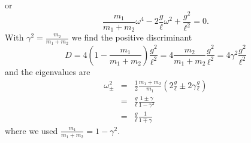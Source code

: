 \documentclass[letterpaper,11pt]{article}
\begin{document}
or
\begin{equation*}
 \frac{m_1}{m_1 + m_2} \omega^4 - 2 \frac{g}{\ell} \omega^2  + \frac{g^2}{\ell^2} = 0.
\end{equation*}
With $\gamma^2 = \frac{m_2}{m_1 + m_2}$ we find the positive discriminant
\begin{equation*}
 D = 4 \left(1 - \frac{m_1}{m_1 + m_2}\right) \frac{g^2}{\ell^2} = 4 \frac{m_2}{m_1 + m_2} \frac{g^2}{\ell^2} = 4 \gamma^2 \frac{g^2}{\ell^2}
\end{equation*}
and the eigenvalues are
\begin{eqnarray*}
 \omega_\pm^2 & = & \frac{1}{2} \frac{m_1 + m_2}{m_1} \left( 2 \frac{g}{\ell}  \pm 2 \gamma \frac{g}{\ell} \right) \\
 & = & \frac{g}{\ell} \frac{1 \pm \gamma}{1 - \gamma^2} \\
 & = & \frac{g}{\ell} \frac{1}{1 \mp \gamma}
\end{eqnarray*}
where we used $\frac{m_1}{m_1 + m_2} = 1 - \gamma^2$.
\end{document}
